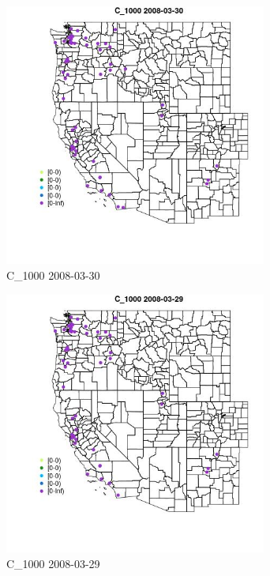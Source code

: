 \begin{figure} 
\centering  
\includegraphics[width=0.77\textwidth]{Code_Outputs/Report_ML_input_PM25_Step4_part_e_de_duplicated_aves_MapObsC_10002008-03-30.jpg} 
\caption{\label{fig:Report_ML_input_PM25_Step4_part_e_de_duplicated_avesMapObsC_10002008-03-30}C_1000 2008-03-30} 
\end{figure} 
 

\begin{figure} 
\centering  
\includegraphics[width=0.77\textwidth]{Code_Outputs/Report_ML_input_PM25_Step4_part_e_de_duplicated_aves_MapObsC_10002008-03-29.jpg} 
\caption{\label{fig:Report_ML_input_PM25_Step4_part_e_de_duplicated_avesMapObsC_10002008-03-29}C_1000 2008-03-29} 
\end{figure} 
 

